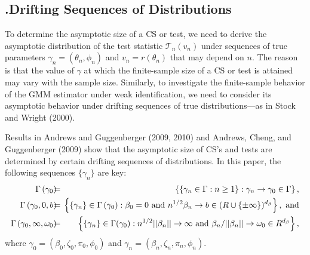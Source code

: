 \documentclass[12pt,titlepage,final,oneside,letterpaper]{article}
\begin{document}
\subsection{\hspace{-0.23in}\textbf{.}\hspace{0.18in}Drifting Sequences of
Distributions\label{Drifting Seqs of Distns}}

\hspace{0.25in}To determine the asymptotic size of a CS or test, we need to
derive the asymptotic distribution of the test statistic $\mathcal{T}%
_{n}(v_{n})$ under sequences of true parameters $\gamma _{n}=(\theta
_{n},\phi _{n})$ and $v_{n}=r(\theta _{n})$ that may depend on $n.$ The
reason is that the value of $\gamma $ at which the finite-sample size of a
CS or test is attained may vary with the sample size. Similarly, to
investigate the finite-sample behavior of the GMM estimator under weak
identification, we need to consider its asymptotic behavior under drifting
sequences of true distributions---as in Stock and Wright (2000).

Results in Andrews and Guggenberger (2009, 2010) and Andrews, Cheng, and
Guggenberger (2009) show that the asymptotic size of CS's and tests are
determined by certain drifting sequences of distributions. In this paper,
the following sequences $\{\gamma _{n}\}$ are key: 
\begin{eqnarray}
\Gamma \left( \gamma _{0}\right) \hspace{-0.08in} &=&\hspace{-0.08in}\left\{
\{\gamma _{n}\in \Gamma :n\geq 1\}:\gamma _{n}\rightarrow \gamma _{0}\in
\Gamma \right\} ,  \label{Seq's of Gamma Par's} \\
\Gamma \left( \gamma _{0},0,b\right) \hspace{-0.08in} &=&\hspace{-0.08in}%
\left\{ \{\gamma _{n}\}\in \Gamma \left( \gamma _{0}\right) :\beta _{0}=0%
\text{ and }n^{1/2}\beta _{n}\rightarrow b\in (R\cup \left\{ \pm \infty
\right\} )^{d_{\beta }}\right\} ,\text{ and}  \notag \\
\Gamma \left( \gamma _{0},\infty ,\omega _{0}\right) \hspace{-0.08in} &=&%
\hspace{-0.08in}\left\{ \{\gamma _{n}\}\in \Gamma (\gamma
_{0}):n^{1/2}||\beta _{n}||\rightarrow \infty \text{ and }\beta _{n}/||\beta
_{n}||\rightarrow \omega _{0}\in R^{d_{\beta }}\right\} ,  \notag
\end{eqnarray}%
where $\gamma _{0}=(\beta _{0},\zeta _{0},\pi _{0},\phi _{0})$ and $\gamma
_{n}=(\beta _{n},\zeta _{n},\pi _{n},\phi _{n}).$
\end{document}
